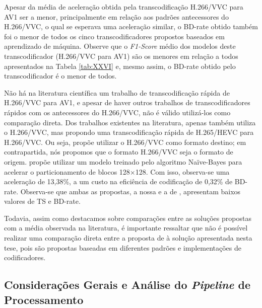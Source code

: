 

Apesar da média de aceleração obtida pela transcodificação H.266/VVC para AV1 ser a menor, principalmente em relação aos padrões antecessores do H.266/VVC, o qual se esperava uma aceleração similar, o BD-rate obtido também foi o menor de todos os cinco transcodificadores propostos baseados em aprendizado de máquina. Observe que o \textit{F1-Score} médio dos modelos deste transcodificador (H.266/VVC para AV1) são os menores em relação a todos apresentados na Tabela \ref{tab:XXVI} e, mesmo assim, o BD-rate obtido pelo transcodificador é o menor de todos.

Não há na literatura científica um trabalho de transcodificação rápida de H.266/VVC para AV1, e apesar de haver outros trabalhos de transcodificadores rápidos com os antecessores do H.266/VVC, não é válido utilizá-los como comparação direta. Dos trabalhos existentes na literatura, apenas \citet{bib:lucas_2020} também utiliza o H.266/VVC, mas propondo uma transcodificação rápida de H.265/HEVC para H.266/VVC. Ou seja, \citet{bib:lucas_2020} propõe utilizar o H.266/VVC como formato destino; em contrapartida, nós propomos que o formato H.266/VVC seja o formato de origem. \cite{bib:lucas_2020} propõe utilizar um modelo treinado pelo algoritmo Naïve-Bayes para acelerar o particionamento de blocos 128$\times$128. Com isso, observa-se uma aceleração de 13,38\%, a um custo na eficiência de codificação de 0,32\% de BD-rate. Observa-se que ambas as propostas, a nossa e a de \citet{bib:lucas_2020}, apresentam baixos valores de TS e BD-rate.

Todavia, assim como destacamos sobre comparações entre as soluções propostas com a média observada na literatura, é importante ressaltar que não é possível realizar uma comparação direta entre a proposta de \citet{bib:lucas_2020} à solução apresentada nesta tese, pois são propostas baseadas em diferentes padrões e implementações de codificadores.

\subsection{Considerações Gerais e Análise do \textit{Pipeline} de Processamento}
\label{cap:7.5.6}

